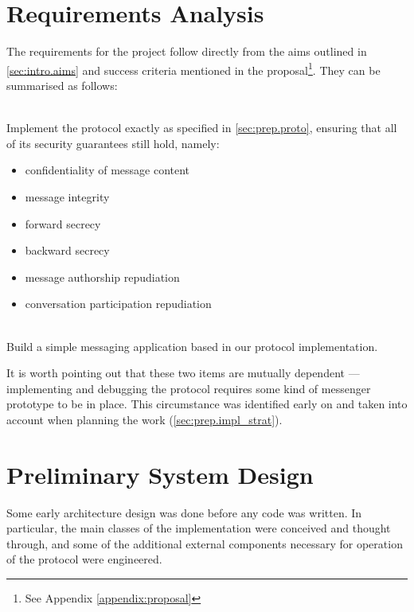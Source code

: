 \documentclass[a4paper, 12pt]{report}
\begin{document}
\section{Requirements Analysis}
\label{sec:prep.requirements}
The requirements for the project follow directly from the aims outlined in \cref{sec:intro.aims} and success criteria mentioned in the proposal\footnote{See Appendix \ref{appendix:proposal}}. They can be summarised as follows:
\begin{description}[labelindent=0.5cm, leftmargin=1.3cm, rightmargin=0.5cm]
    \item[Implementing the protocol] \hfill \\
        Implement the protocol exactly as specified in \cref{sec:prep.proto}, ensuring that all of its security guarantees still hold, namely:
        \begin{itemize}
            \item confidentiality of message content
            \item message integrity
            \item forward secrecy
            \item backward secrecy
            \item message authorship repudiation
            \item conversation participation repudiation
        \end{itemize}


    \item[Construct a useable messaging application] \hfill \\
        Build a simple messaging application based in our protocol implementation.     
\end{description}
It is worth pointing out that these two items are mutually dependent --- implementing and debugging the protocol requires some kind of messenger prototype to be in place. This circumstance was identified early on and taken into account when planning the work (\cref{sec:prep.impl_strat}). \\


\section{Preliminary System Design}
\label{sec:prep.design}
Some early architecture design was done before any code was written. In particular, the main classes of the implementation were conceived and thought through, and some of the additional external components necessary for operation of the protocol were engineered.
\end{document}
